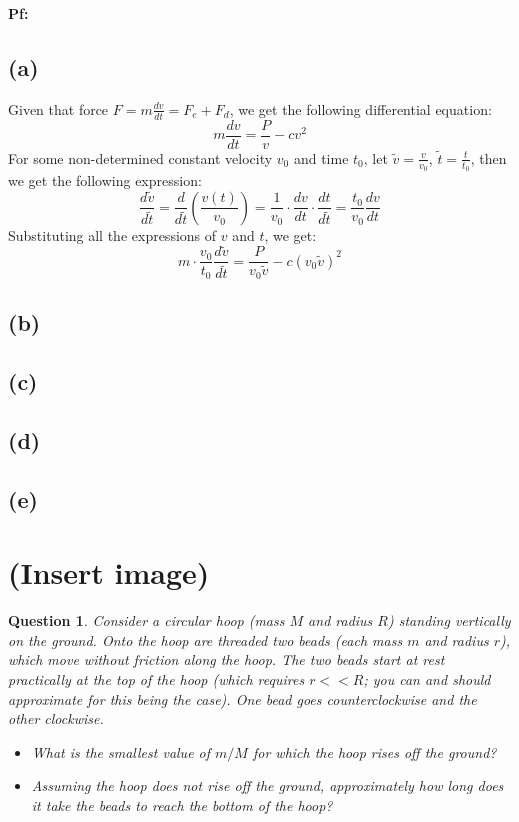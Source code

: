 \documentclass{article}
\newtheorem{question}{Question}
\begin{document}
\textbf{Pf:}
\subsection*{(a)}
Given that force $F=m\frac{dv}{dt}=F_e + F_d$, we get the following differential equation:
$$m\frac{dv}{dt}=\frac{P}{v}-cv^2$$
For some non-determined constant velocity $v_0$ and time $t_0$, let $\tilde{v}=\frac{v}{v_0}$, $\tilde{t}=\frac{t}{t_0}$, then we get the following expression:
$$\frac{d\tilde{v}}{d\tilde{t}} = \frac{d}{d\tilde{t}}\left(\frac{v(t)}{v_0}\right) = \frac{1}{v_0}\cdot \frac{dv}{dt}\cdot \frac{dt}{d \tilde{t}} = \frac{t_0}{v_0}\frac{dv}{dt}$$
Substituting all the expressions of $v$ and $t$, we get:
$$m\cdot \frac{v_0}{t_0}\frac{d\tilde{v}}{d\tilde{t}} = \frac{P}{v_0\tilde{v}}-c(v_0\tilde{v})^2$$


\subsection*{(b)}

\subsection*{(c)}

\subsection*{(d)}

\subsection*{(e)}

\break

\section{(Insert image)}%
\begin{question}\label{q4}
    Consider a circular hoop (mass $M$ and radius $R$) standing vertically on the ground. Onto the hoop are threaded two beads (each mass $m$ and radius $r$), which move without friction along the hoop. The two beads start at rest practically at the top of the hoop (which requires $r<<R$; you can and should approximate for this being the case). One bead goes counterclockwise and the other clockwise.
    \begin{itemize}
        \item[(a)] What is the smallest value of $m/M$ for which the hoop rises off the ground?
        \item[(b)] Assuming the hoop does not rise off the ground, approximately how long does it take the beads to reach the bottom of the hoop? 
    \end{itemize}
\end{question}
\end{document}
